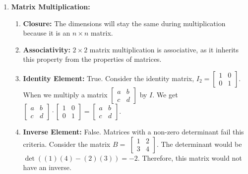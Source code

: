 {\begin{enumerate}
\begin{enumerate}[label=(\arabic*)]
              \end{enumerate}
        \item \textbf{Matrix Multiplication:} \xmark
              \begin{enumerate}[label=(\arabic*)]
                  \item \textbf{Closure:} The dimensions will stay the same during multiplication because it is an \(n \times n\) matrix.
                  \item \textbf{Associativity:} \(2 \times 2\) matrix multiplication is associative, as it inherits this property from the properties of matrices.
                  \item \textbf{Identity Element:} True. Consider the identity matrix, \(I_2 =
                        \begin{bmatrix}
                            1 & 0 \\
                            0 & 1
                        \end{bmatrix}\). When we multiply a matrix \(\begin{bmatrix}
                            a & b \\
                            c & d
                        \end{bmatrix}\) by \(I\). We get \(\begin{bmatrix}
                                a & b \\
                                c & d
                            \end{bmatrix} \cdot
                        \begin{bmatrix}
                            1 & 0 \\
                            0 & 1
                        \end{bmatrix} = \begin{bmatrix}
                            a & b \\
                            c & d
                        \end{bmatrix}\).
                  \item \textbf{Inverse Element:} False. Matrices with a non-zero determinant fail this criteria. Consider the matrix \(B =\)
                        \(\begin{bmatrix}
                            1 & 2 \\
                            3 & 4
                        \end{bmatrix}\). The determinant would be \(\det((1)(4) - (2)(3)) = -2\). Therefore, this matrix would not have an inverse.
              \end{enumerate}
    \end{enumerate}
}

